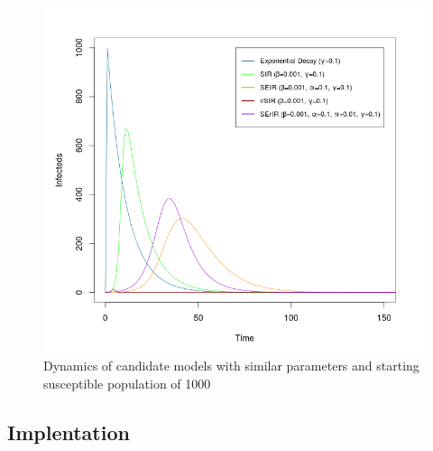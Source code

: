 \begin{figure}
\centering
\includegraphics[width=16cm]{images/candidates}
\caption{Dynamics of candidate models with similar parameters and
  starting susceptible population of 1000}
\label{figure:candidates}
\end{figure}

\subsection{Implentation}
